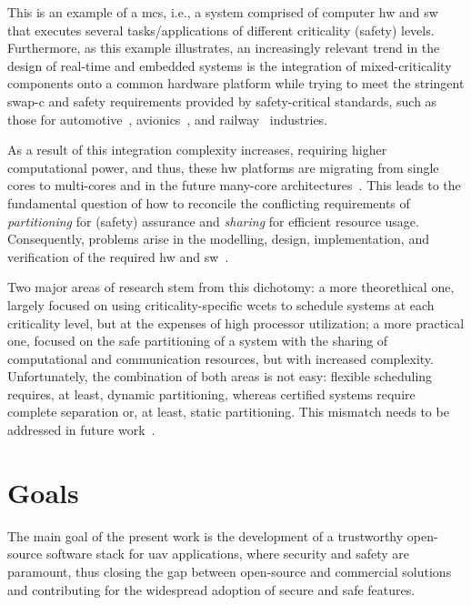 This is an example of a \gls{mcs}, i.e., a system comprised of computer
\gls{hw} and \gls{sw} that executes several tasks/applications of different
criticality (safety) levels. Furthermore, as this example illustrates, an increasingly relevant trend in the design of real-time and embedded systems
is the integration of mixed-criticality components onto a common hardware
platform while trying to meet the stringent \gls{swap-c} and safety requirements
provided by safety-critical standards, such as those for automotive~\cite{iso26262}, avionics~\cite{rtca1992software},
and railway~\cite{cenelec201250128} industries.

As a result of this integration
complexity increases, requiring higher computational power, and thus, these
\gls{hw} platforms are migrating from single cores to multi-cores and in the
future many-core architectures~\cite{burns2022mixed}. This leads to the
fundamental question of how to reconcile the
conflicting requirements of \emph{partitioning} for (safety) assurance and \emph{sharing} for
efficient resource usage. Consequently, problems arise in the modelling, design,
implementation, and verification of the required \gls{hw} and
\gls{sw}~\cite{burns2022mixed}.

Two major areas of research stem from this dichotomy: a more theorethical one,
largely focused on using criticality-specific \glspl{wcet} to schedule systems
at each criticality level, but at the expenses of high processor utilization; a
more practical one, focused on the safe partitioning of a system with the
sharing of computational and communication resources, but with increased
complexity.
Unfortunately, the combination of both areas is not easy: flexible scheduling
requires, at least, dynamic partitioning, whereas certified systems require
complete separation or, at least, static partitioning. This mismatch needs to be
addressed in future work~\cite{burns2022mixed}.

%

\section{Goals}
The main goal of the present work is the development of a trustworthy
open-source software stack for \gls{uav} applications, where security and safety
are paramount, thus closing the gap between open-source and commercial solutions
and contributing for the widespread adoption of secure and safe features.

